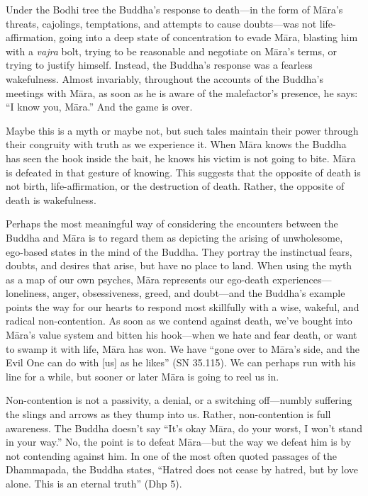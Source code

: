 
Under the Bodhi tree the Buddha's response to death---in the form of 
Māra's threats, cajolings, temptations, and attempts to cause 
doubts---was not life-affirmation, going into a deep state of 
concentration to evade Māra, blasting him with a \emph{vajra} bolt, 
trying to be reasonable and negotiate on Māra's terms, or trying to 
justify himself. Instead, the Buddha's response was a fearless 
wakefulness. Almost invariably, throughout the accounts of the Buddha's 
meetings with Māra, as soon as he is aware of the malefactor's 
presence, he says: ``I know you, Māra.'' And the game is over.

Maybe this is a myth or maybe not, but such tales maintain their power 
through their congruity with truth as we experience it. When Māra 
knows the Buddha has seen the hook inside the bait, he knows his victim 
is not going to bite. Māra is defeated in that gesture of knowing. 
This suggests that the opposite of death is not birth, 
life-affirmation, or the destruction of death. Rather, the opposite of 
death is wakefulness.

Perhaps the most meaningful way of considering the encounters between 
the Buddha and Māra is to regard them as depicting the arising of 
unwholesome, ego-based states in the mind of the Buddha. They portray 
the instinctual fears, doubts, and desires that arise, but have no 
place to land. When using the myth as a map of our own psyches, Māra 
represents our ego-death experiences---loneliness, anger, 
obsessiveness, greed, and doubt---and the Buddha's example points the 
way for our hearts to respond most skillfully with a wise, wakeful, and 
radical non-contention. As soon as we contend against death, we've 
bought into Māra's value system and bitten his hook---when we hate and 
fear death, or want to swamp it with life, Māra has won. We have 
``gone over to Māra's side, and the Evil One can do with [us] as he 
likes'' (SN 35.115). We can perhaps run with his line for a while, but 
sooner or later Māra is going to reel us in.

Non-contention is not a passivity, a denial, or a switching 
off---numbly suffering the slings and arrows as they thump into us. 
Rather, non-contention is full awareness. The Buddha doesn't say ``It's 
okay Māra, do your worst, I won't stand in your way.'' No, the point 
is to defeat Māra---but the way we defeat him is by not contending 
against him. In one of the most often quoted passages of the 
Dhammapada, the Buddha states, ``Hatred does not cease by hatred, but 
by love alone. This is an eternal truth'' (Dhp 5).

